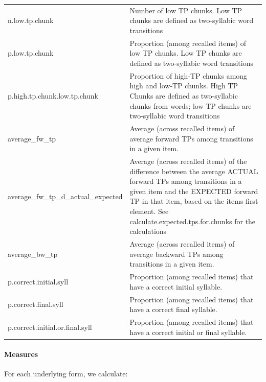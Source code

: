 \documentclass[]{article}
\let\oldparagraph\paragraph
\renewcommand{\paragraph}[1]{\oldparagraph{#1}\mbox{}}
\begin{document}
\begin{table}[!h]
{\begin{tabular}[t]{l>{\raggedright\arraybackslash}p{30em}}
n.low.tp.chunk & Number of low TP chunks. Low TP chunks are defined as two-syllabic word transitions\\
\addlinespace
p.low.tp.chunk & Proportion (among recalled items) of low TP chunks. Low TP chunks are defined as two-syllabic word transitions\\
p.high.tp.chunk.low.tp.chunk & Proportion of high-TP chunks among high and low-TP chunks. High TP Chunks are defined as two-syllabic chunks from words; low TP chunks are two-syllabic word transitions\\
average\_fw\_tp & Average (across recalled items) of average forward TPs among transitions in a given item.\\
average\_fw\_tp\_d\_actual\_expected & Average (across recalled items) of the difference between the average ACTUAL forward TPs among transitions in a given item and the EXPECTED forward TP in that item, based on the items first element. See calculate.expected.tps.for.chunks for the calculations\\
average\_bw\_tp & Average (across recalled items) of average backward TPs among transitions in a given item.\\
\addlinespace
p.correct.initial.syll & Proportion (among recalled items) that have a correct initial syllable.\\
p.correct.final.syll & Proportion (among recalled items) that have a correct final syllable.\\
p.correct.initial.or.final.syll & Proportion (among recalled items) that have a correct initial or final syllable.\\
\bottomrule
\end{tabular}}
\end{table}


\paragraph{Measures}\label{measures}

For each underlying form, we calculate:
\end{document}
